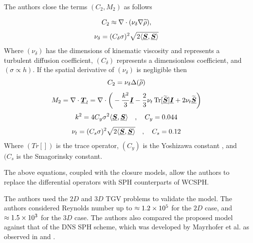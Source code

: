 The authors close the terms $(C_2, M_2)$ as follows

\begin{equation}
    C_2 \approx \nabla \cdot (\nu_{\delta} \nabla\widetilde{\rho}),
\end{equation}
\begin{equation}
    \nu_{\delta} = (C_{\delta}\sigma)^2\sqrt{2\langle \underline{\bm{S}}, \underline{\bm{S}} \rangle}
\end{equation}
Where $(\nu_{\delta})$ has the dimensions of kinematic viscosity and represents a turbulent diffusion coefficient, $(C_{\delta})$ represents a dimensionless coefficient, and $(\sigma \propto h)$. If the spatial derivative of $(\nu_{\delta})$ is negligible then
\begin{equation}
    C_2 = \nu_{\delta} \Delta(\widetilde{\rho})
\end{equation}
\begin{equation}
    M_2 = \nabla \cdot \underline{\bm{T}}_l = \nabla \cdot \bigg( -\frac{k^2}{3}\underline{\bm{I}} - \frac{2}{3}\nu_t \operatorname{Tr}[\widetilde{\underline{\bm{S}}}]\underline{\bm{I}} + 2\nu_t\widetilde{\underline{\bm{S}}} \bigg)
\end{equation}
\begin{equation}
    k^2 = 4 C_y \sigma^2 \langle \underline{\bm{S}}, \underline{\bm{S}} \rangle \quad , \quad C_y=0.044
\end{equation}
\begin{equation}
    \nu_t = (C_s\sigma)^2\sqrt{2 \langle \underline{\bm{S}}, \underline{\bm{S}} \rangle} \quad , \quad C_s=0.12
\end{equation}
Where $(Tr[])$ is the trace operator, $(C_y)$ is the Yoshizawa constant \parencite{yoshizawa1986statistical}, and $(C_s$ is the Smagorinsky constant.

The above equations, coupled with the closure models, allow the authors to replace the differential operators with SPH counterparts of WCSPH.

The authors used the  $2D$ and $3D$ TGV problems to validate the model. The authors considered Reynolds number up to $\approx 1.2 \times {10}^{5}$ for the $2D$ case, and $\approx 1.5 \times {10}^{3}$ for the $3D$ case. The authors also compared the proposed model against that of the DNS SPH scheme, which was developed by Mayrhofer et al. \parencite{mayrhofer2015dns} as observed in  and .

